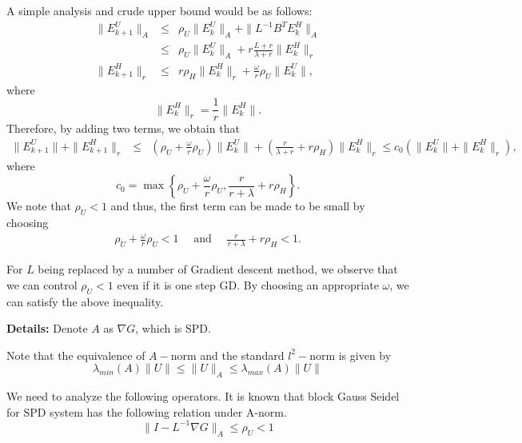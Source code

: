 A simple analysis and crude upper bound would be as follows: 
\begin{eqnarray*}
\|E_{k+1}^U\|_{A} &\leq& \rho_U \|E_k^U\|_{A} + \|L^{-1} B^T E_k^H\|_{A} \\ 
&\leq&  \rho_U \|E_k^U\|_{A} + r \frac{L + r}{\lambda + r} \|E_k^H\|_r \\
\|E_{k+1}^H\|_r &\leq& r \rho_H \|E_k^H\|_r + \frac{\omega}{r} \rho_U \|E_k^U\|,  
\end{eqnarray*}
where 
\begin{equation}
\|E_k^H\|_r = \frac{1}{r}\|E_k^H\|.   
\end{equation}
Therefore, by adding two terms, we obtain that 
\begin{eqnarray*}
\|E_{k+1}^U\| + \|E_{k+1}^H\|_r &\leq& \left ( \rho_U + \frac{\omega}{r} \rho_U \right) \|E_k^U\| + \left ( \frac{r}{\lambda + r} + r \rho_H \right ) \|E_k^H\|_r \leq c_0 \left ( \|E_{k}^U\| + \|E_{k}^H\|_r \right ),  
\end{eqnarray*}
where 
\begin{equation}
c_0 = \max \left \{ \rho_U + \frac{\omega}{r} \rho_U, \frac{r}{r+\lambda} + r\rho_H \right \}. 
\end{equation} 
We note that $\rho_U < 1$ and thus, the first term can be made to be small by choosing 
\begin{eqnarray}
\rho_U + \frac{\omega}{r} \rho_U < 1 \quad \mbox{ and } \quad \frac{r}{r+\lambda} + r\rho_H < 1. 
\end{eqnarray}
\begin{remark}
For $L$ being replaced by a number of Gradient descent method, we observe that we can control $\rho_U < 1$ even if it is one step GD. By choosing an appropriate $\omega$, we can satisfy the above inequality. 
\end{remark}


\textbf{Details: }
Denote $A$ as $\nabla G$, which is SPD. 

Note that the equivalence of $A-$norm and the standard $l^2-$norm is given by 
\begin{equation}
  \lambda_{min} (A) \|U  \| \leq    \| U \|_A \leq \lambda_{max} (A )\|U  \|
\end{equation}

We need to analyze the following operators. 
It is known that block Gauss Seidel for SPD system has the following relation under A-norm.
\begin{equation}
    \| I - L^{-1} \nabla G \|_A \leq \rho_U < 1 
\end{equation}


